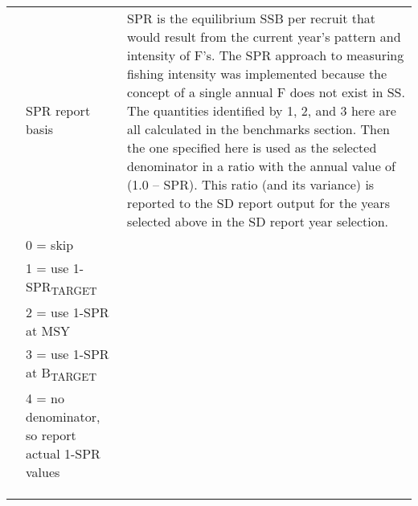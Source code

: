 \begin{landscape}
\begin{longtable}{p{3cm} p{7cm} p{11cm}}
 \pagebreak
 1 & SPR report basis & \multirow{1}{1cm}[-0.1cm]{\parbox{11cm}{SPR is the equilibrium SSB per recruit that would result from the current year’s pattern and intensity of F’s.  The SPR approach to measuring fishing intensity was implemented because the concept of a single annual F does not exist in SS.
		The quantities identified by 1, 2, and 3 here are all calculated in the benchmarks section.  Then the one specified here is used as the selected denominator in a ratio with the annual value of (1.0 – SPR). This ratio (and its variance) is reported to the SD report output for the years selected above in the SD report year selection.}}\\
   & 0 = skip & \\
   & 1 = use 1-SPR\textsubscript{TARGET} & \\
   & 2 = use 1-SPR at MSY & \\
   & 3 = use 1-SPR at B\textsubscript{TARGET} & \\
   & 4 = no denominator, so report actual 1-SPR values & \\
   & & \\
   & & \\
   & & \\
  

\end{longtable}
\end{landscape}
